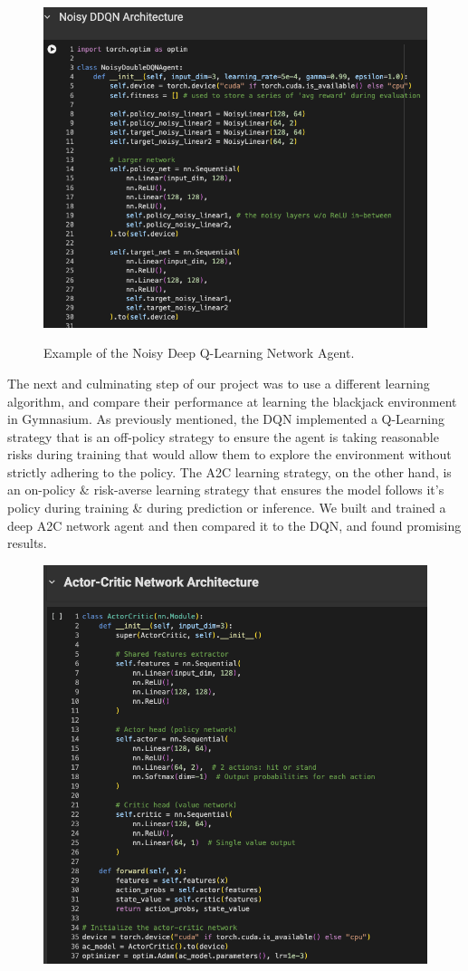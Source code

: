 \documentclass[compsoc]{IEEEtran}
\begin{document}
{\begin{figure}[h]
\centering
{\includegraphics[scale=0.3]{./fig/NoisyDDQN.png}}
\caption{Example of the Noisy Deep Q-Learning Network Agent.}
\end{figure}
The next and culminating step of our project was to use a different learning algorithm, and compare their performance at learning the blackjack environment in Gymnasium. As previously mentioned, the  DQN implemented a Q-Learning strategy that is an off-policy strategy to ensure the agent is taking reasonable risks during training that would allow them to explore the environment without strictly adhering to the policy. The A2C learning strategy, on the other hand, is an on-policy \& risk-averse learning strategy that ensures the model follows it's policy during training \& during prediction or inference. We built and trained a deep A2C network agent and then compared it to the DQN, and found promising results.
\begin{figure}[h]
{\includegraphics[scale=0.28]{./fig/AC2.png}}

\end{figure}}
\end{document}
